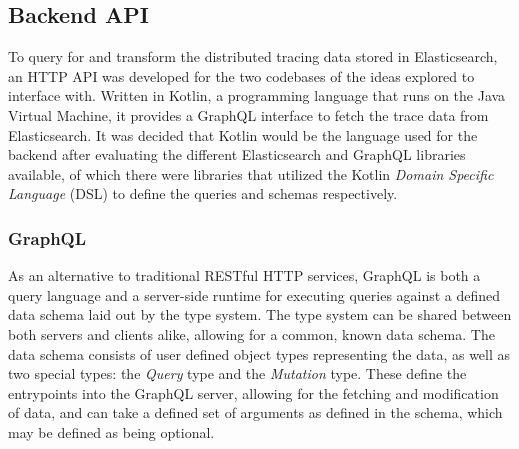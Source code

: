 \documentclass[12pt,pdftex,titlepage]{report}
\begin{document}


            \subsection{Backend API}
                To query for and transform the distributed tracing data stored in Elasticsearch, an HTTP API was developed for the two codebases of the ideas explored to interface with.
                Written in Kotlin, a programming language that runs on the Java Virtual Machine, it provides a GraphQL interface to fetch the trace data from Elasticsearch. It was 
                decided that Kotlin would be the language used for the backend after evaluating the different Elasticsearch and GraphQL libraries available, of which there were libraries 
                that utilized the Kotlin \textit{Domain Specific Language} (DSL) to define the queries and schemas respectively.
                
                \subsubsection{GraphQL}
                    As an alternative to traditional RESTful HTTP services, GraphQL is both a query language and a server-side runtime for executing queries against a defined data schema
                    laid out by the type system. The type system can be shared between both servers and clients alike, allowing for a common, known data schema. The data schema consists of 
                    user defined object types representing the data, as well as two special types: the \textit{Query} type and the \textit{Mutation} type. These define the entrypoints into
                    the GraphQL server, allowing for the fetching and modification of data, and can take a defined set of arguments as defined in the schema, which may be defined as being
                    optional.\newpage
\end{document}
